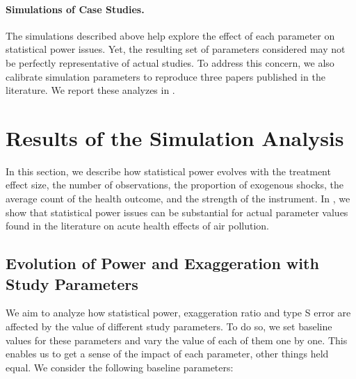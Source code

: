 \documentclass[12pt]{article}
\begin{document}
        \paragraph{Simulations of Case Studies.} The simulations described above help explore the effect of each parameter on statistical power issues. Yet, the resulting set of parameters considered may not be perfectly representative of actual studies. To address this concern, we also calibrate simulation parameters to reproduce three papers published in the literature. We report these analyzes in .




\section{Results of the Simulation Analysis}\label{section_results}

        In this section, we describe how statistical power evolves with the treatment effect size, the number of observations, the proportion of exogenous shocks, the average count of the health outcome, and the strength of the instrument. In , we show that statistical power issues can be substantial for actual parameter values found in the literature on acute health effects of air pollution. 

        \subsection{Evolution of Power and Exaggeration with Study Parameters}

        We aim to analyze how statistical power, exaggeration ratio and type S error are affected by the value of different study parameters. To do so, we set baseline values for these parameters and vary the value of each of them one by one. This enables us to get a sense of the impact of each parameter, other things held equal. We consider the following baseline parameters:
\end{document}
